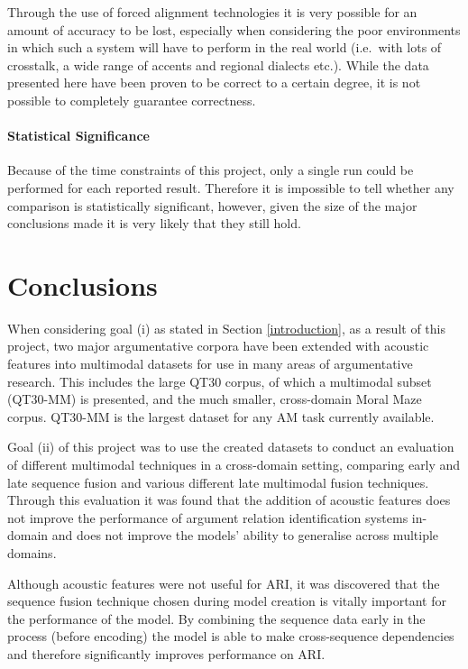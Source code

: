 \documentclass[twocolumn,twoside]{article}
\begin{document}
Through the use of forced alignment technologies it is very possible for
an amount of accuracy to be lost, especially when considering the poor
environments in which such a system will have to perform in the real
world (i.e.~with lots of crosstalk, a wide range of accents and regional
dialects etc.). While the data presented here have been proven to be
correct to a certain degree, it is not possible to completely guarantee
correctness.

\paragraph{Statistical Significance}\label{statistical-significance}

Because of the time constraints of this project, only a single run could
be performed for each reported result. Therefore it is impossible to
tell whether any comparison is statistically significant, however, given
the size of the major conclusions made it is very likely that they still
hold.

\section{Conclusions}\label{conclusions}

When considering goal (i) as stated in Section \ref{introduction}, as a
result of this project, two major argumentative corpora have been
extended with acoustic features into multimodal datasets for use in many
areas of argumentative research. This includes the large QT30 corpus, of
which a multimodal subset (QT30-MM) is presented, and the much smaller,
cross-domain Moral Maze corpus. QT30-MM is the largest dataset for any
AM task currently available.

Goal (ii) of this project was to use the created datasets to conduct an
evaluation of different multimodal techniques in a cross-domain setting,
comparing early and late sequence fusion and various different late
multimodal fusion techniques. Through this evaluation it was found that
the addition of acoustic features does not improve the performance of
argument relation identification systems in-domain and does not improve
the models' ability to generalise across multiple domains.

Although acoustic features were not useful for ARI, it was discovered
that the sequence fusion technique chosen during model creation is
vitally important for the performance of the model. By combining the
sequence data early in the process (before encoding) the model is able
to make cross-sequence dependencies and therefore significantly improves
performance on ARI.
\end{document}
